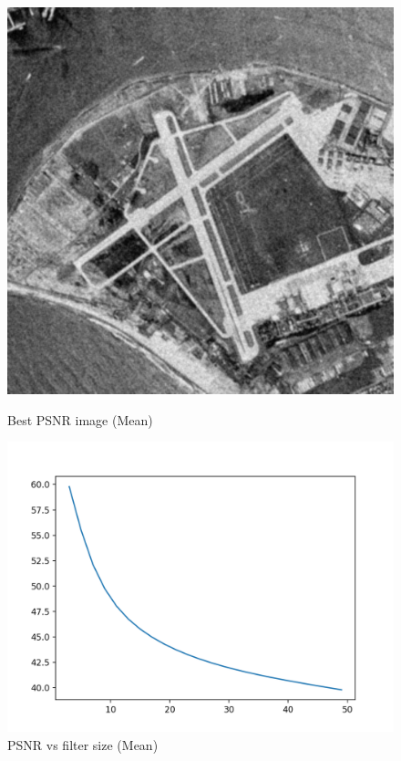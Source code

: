 \documentclass{article}
\begin{document}
    \begin{figure}[!htb]
      \includegraphics[scale=0.3]{./basic_denoising/sandiego/average_best_gaussian.png}
      \caption{Best PSNR image (Mean)}
    \endminipage \hfill
      \includegraphics[scale=.45]{./basic_denoising/sandiego/average_psnr_gaussian.png}
      \caption{PSNR vs filter size (Mean)}
    \endminipage
    \end{figure}
    
\end{document}
